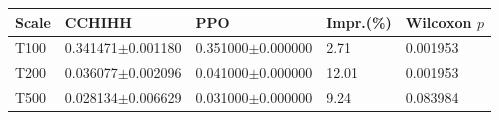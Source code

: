 \begin{tabular}{lllll}
\hline
Scale & CCHIHH & PPO & Impr.(\%) & Wilcoxon $p$ \\
\hline
T100 & 0.341471$\pm$0.001180 & 0.351000$\pm$0.000000 & 2.71 & 0.001953 \\
T200 & 0.036077$\pm$0.002096 & 0.041000$\pm$0.000000 & 12.01 & 0.001953 \\
T500 & 0.028134$\pm$0.006629 & 0.031000$\pm$0.000000 & 9.24 & 0.083984 \\
\hline
\end{tabular}